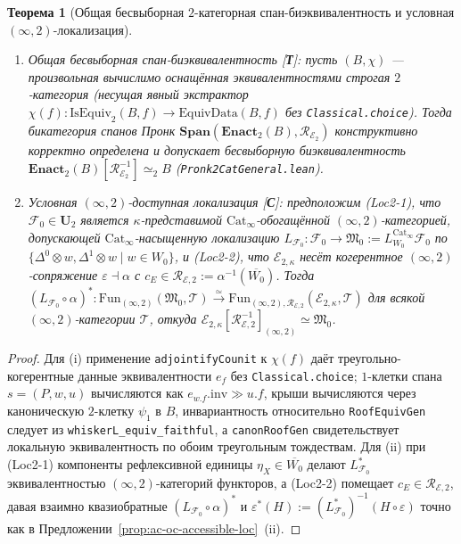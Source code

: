 \documentclass[11pt]{article}
\theoremstyle{plain}
\newtheorem{theorem}{Теорема}[section]
\theoremstyle{definition}
\newcommand{\cF}{\mathcal{F}}
\newcommand{\fM}{\mathfrak{M}}
\newcommand{\Fun}{\mathrm{Fun}}
\newcommand{\Cat}{\mathrm{Cat}}
\newcommand{\cE}{\mathcal{E}}
\begin{document}
\begin{theorem}[Общая бесвыборная $2$-категорная спан-биэквивалентность и условная $(\infty, 2)$-локализация]\label{thm:ac-oc-2cat-loc}
\begin{enumerate}[nosep,label=(\roman*)]
\item \emph{Общая бесвыборная спан-биэквивалентность \textup{[\textbf{Т}]}}: пусть $(B, \chi)$ — произвольная вычислимо оснащённая эквивалентностями строгая $2$-категория (несущая явный экстрактор $\chi(f) : \mathrm{IsEquiv}_2(B, f) \to \mathrm{EquivData}(B, f)$ без \texttt{Classical.choice}). Тогда бикатегория спанов Пронк $\mathbf{Span}(\mathbf{Enact}_2(B), \mathcal{R}_{\cE_2})$ конструктивно корректно определена и допускает бесвыборную биэквивалентность $\mathbf{Enact}_2(B)[\mathcal{R}_{\cE_2}^{-1}] \simeq_2 B$ (\texttt{Pronk2CatGeneral.lean}).
\item \emph{Условная $(\infty, 2)$-доступная локализация \textup{[\textbf{С}]}}: предположим \textup{(Loc2-1)}, что $\cF_0 \in \mathbf{U}_2$ является $\kappa$-представимой $\Cat_\infty$-обогащённой $(\infty, 2)$-категорией, допускающей $\Cat_\infty$-насыщенную локализацию $L_{\cF_0} : \cF_0 \to \fM_0 := L_{W_0}^{\Cat_\infty}\cF_0$ по $\{\Delta^0 \otimes w, \Delta^1 \otimes w \mid w \in W_0\}$, и \textup{(Loc2-2)}, что $\cE_{2,\kappa}$ несёт когерентное $(\infty, 2)$-сопряжение $\varepsilon \dashv \alpha$ с $c_E \in \mathcal{R}_{\cE, 2} := \alpha^{-1}(\overline{W_0})$. Тогда $(L_{\cF_0} \circ \alpha)^* : \Fun_{(\infty,2)}(\fM_0, \mathcal{T}) \xrightarrow{\simeq} \Fun_{(\infty,2), \mathcal{R}_{\cE,2}}(\cE_{2,\kappa}, \mathcal{T})$ для всякой $(\infty, 2)$-категории $\mathcal{T}$, откуда $\cE_{2,\kappa}[\mathcal{R}_{\cE,2}^{-1}]_{(\infty,2)} \simeq \fM_0$.
\end{enumerate}
\end{theorem}
\begin{proof}
Для (i) применение \texttt{adjointifyCounit} к $\chi(f)$ даёт треугольно-когерентные данные эквивалентности $e_f$ без \texttt{Classical.choice}; $1$-клетки спана $s = (P, w, u)$ вычисляются как $e_{w.f}.\mathrm{inv} \gg u.f$, крыши вычисляются через каноническую $2$-клетку $\psi_1$ в $B$, инвариантность относительно \texttt{RoofEquivGen} следует из \texttt{whiskerL\_equiv\_faithful}, а \texttt{canonRoofGen} свидетельствует локальную эквивалентность по обоим треугольным тождествам. Для (ii) при \textup{(Loc2-1)} компоненты рефлексивной единицы $\eta_X \in \overline{W_0}$ делают $L_{\cF_0}^*$ эквивалентностью $(\infty,2)$-категорий функторов, а \textup{(Loc2-2)} помещает $c_E \in \mathcal{R}_{\cE,2}$, давая взаимно квазиобратные $(L_{\cF_0} \circ \alpha)^*$ и $\varepsilon^*(H) := (L_{\cF_0}^*)^{-1}(H \circ \varepsilon)$ точно как в Предложении~\ref{prop:ac-oc-accessible-loc}~(ii).
\end{proof}
\end{document}
